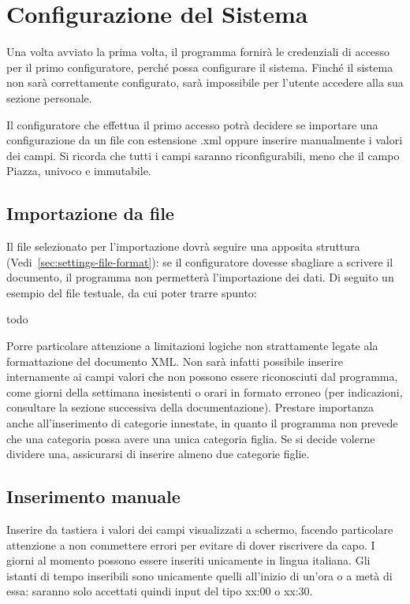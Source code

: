 
\section{Configurazione del Sistema}
Una volta avviato la prima volta, il programma fornirà le credenziali di accesso per il primo configuratore, perché possa configurare il sistema.
Finché il sistema non sarà correttamente configurato, sarà impossibile per l'utente accedere alla sua sezione personale.

Il configuratore che effettua il primo accesso potrà decidere se importare una configurazione da un file con estensione .xml oppure inserire manualmente i valori dei campi.
Si ricorda che tutti i campi saranno riconfigurabili, meno che il campo Piazza, univoco e immutabile.

\subsection{Importazione da file}
Il file selezionato per l'importazione dovrà seguire una apposita struttura (Vedi~\ref{sec:settings-file-format}): se il configuratore dovesse sbagliare a scrivere il documento, il programma non permetterà l'importazione dei dati.
Di seguito un esempio del file testuale, da cui poter trarre spunto:

todo

Porre particolare attenzione a limitazioni logiche non strattamente legate ala formattazione del documento XML.
Non sarà infatti possibile inserire internamente ai campi valori che non possono essere riconosciuti dal programma, come giorni della settimana inesistenti o orari in formato erroneo (per indicazioni, consultare la sezione successiva della documentazione).
Prestare importanza anche all'inserimento di categorie innestate, in quanto il programma non prevede che una categoria possa avere una unica categoria figlia. Se si decide volerne dividere una, assicurarsi di inserire almeno due categorie figlie.

\subsection{Inserimento manuale}
Inserire da tastiera i valori dei campi visualizzati a schermo, facendo particolare attenzione a non commettere errori per evitare di dover riscrivere da capo.
I giorni al momento possono essere inseriti unicamente in lingua italiana.
Gli istanti di tempo inseribili sono unicamente quelli all'inizio di un'ora o a metà di essa: saranno solo accettati quindi input del tipo xx:00 o xx:30.

